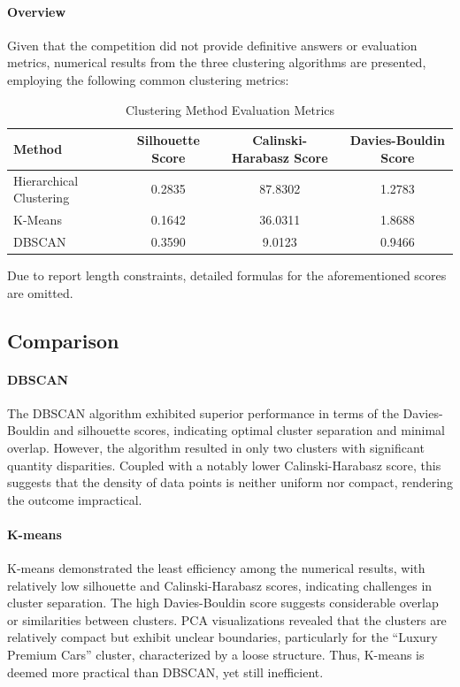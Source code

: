 \documentclass{article}
\begin{document}
\paragraph{Overview}
Given that the competition did not provide definitive answers or evaluation metrics, numerical results from the three clustering algorithms are presented, employing the following common clustering metrics:
\begin{table}[H]
    \centering
    \caption{Clustering Method Evaluation Metrics}
    \label{tab:clustering_scores}
    \begin{tabular}{lccc}
        \toprule
        \textbf{Method}         & \textbf{Silhouette Score} & \textbf{Calinski-Harabasz Score} & \textbf{Davies-Bouldin Score} \\
        \midrule
        Hierarchical Clustering & 0.2835                    & 87.8302                          & 1.2783                        \\
        K-Means                 & 0.1642                    & 36.0311                          & 1.8688                        \\
        DBSCAN                  & 0.3590                    & 9.0123                           & 0.9466                        \\
        \bottomrule
    \end{tabular}
\end{table}

Due to report length constraints, detailed formulas for the aforementioned scores are omitted.

\subsection{Comparison}
\paragraph{DBSCAN}
The DBSCAN algorithm exhibited superior performance in terms of the Davies-Bouldin and silhouette scores, indicating optimal cluster separation and minimal overlap.
However, the algorithm resulted in only two clusters with significant quantity disparities.
Coupled with a notably lower Calinski-Harabasz score, this suggests that the density of data points is neither uniform nor compact, rendering the outcome impractical.

\paragraph{K-means}
K-means demonstrated the least efficiency among the numerical results, with relatively low silhouette and Calinski-Harabasz scores, indicating challenges in cluster separation.
The high Davies-Bouldin score suggests considerable overlap or similarities between clusters.
PCA visualizations revealed that the clusters are relatively compact but exhibit unclear boundaries, particularly for the ``Luxury Premium Cars'' cluster, characterized by a loose structure.
Thus, K-means is deemed more practical than DBSCAN, yet still inefficient.
\end{document}
